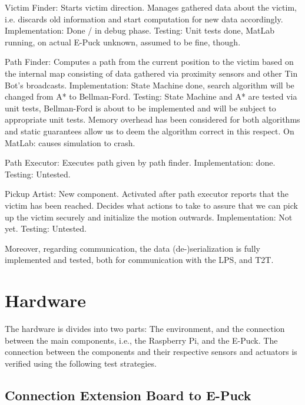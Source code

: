 \documentclass[a4paper,parskip,headheight=38pt]{scrartcl} %
\newcommand{\ie}{i.e.}
\begin{document}
Victim Finder: 
Starts victim direction. Manages gathered data about the victim, i.e. discards old information and start computation for new data accordingly.
Implementation: Done / in debug phase. 
Testing: Unit tests done, MatLab running, on actual E-Puck unknown, assumed to be fine, though.

Path Finder: 
Computes a path from the current position to the victim based on the internal map consisting of data gathered via proximity sensors and other Tin Bot's broadcasts.
Implementation: State Machine done, search algorithm will be changed from A* to Bellman-Ford.
Testing: State Machine and A* are tested via unit tests, Bellman-Ford is about to be implemented and will be subject to appropriate unit tests. Memory overhead has been considered for both algorithms and static guarantees allow us to deem the algorithm correct in this respect. On MatLab: causes simulation to crash.

Path Executor:
Executes path given by path finder.
Implementation: done.
Testing: Untested.

Pickup Artist:
New component. Activated after path executor reports that the victim has been reached. Decides what actions to take to assure that we can pick up the victim securely and initialize the motion outwards.
Implementation: Not yet.
Testing: Untested.

Moreover, regarding communication, the data (de-)serialization is fully implemented and tested, both for communication with the LPS, and T2T.

\section{Hardware} 
The hardware is divides into two parts: The environment, and the connection
between the main components, \ie, the Raspberry Pi, and the E-Puck. 
The connection between the components and their respective sensors and actuators
is verified using the following test strategies.

\subsection{Connection Extension Board to E-Puck}
\end{document}
